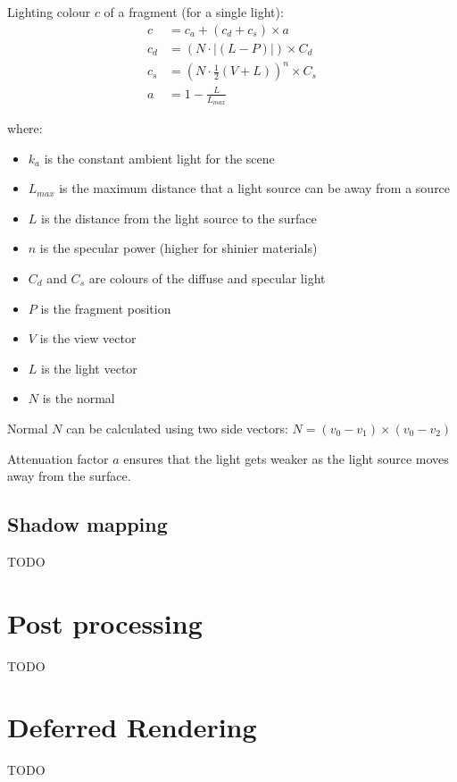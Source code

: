 \documentclass[a4paper]{article}
\begin{document}
Lighting colour $c$ of a fragment (for a single light):
\begin{align*}
  c &= c_{a} + (c_{d} + c_{s}) \times a \\
  c_{d} &= (N \cdot |(L - P)|) \times C_{d} \\
  c_{s} &= (N \cdot \frac{1}{2}(V + L))^{n} \times C_{s}\\
  a &= 1 - \frac{L}{L_{max}}
\end{align*}

where:

\begin{itemize}
  \item $k_{a}$ is the constant ambient light for the scene
  \item $L_{max}$ is the maximum distance that a light source can be away from a
    source
  \item $L$ is the distance from the light source to the surface
  \item $n$ is the specular power (higher for shinier materials)
  \item $C_{d}$ and $C_{s}$ are colours of the diffuse and specular light
  \item $P$ is the fragment position
  \item $V$ is the view vector
  \item $L$ is the light vector
  \item $N$ is the normal
\end{itemize}

Normal $N$ can be calculated using two side vectors: $N = (v_{0} - v_{1}) \times
(v_{0} - v_{2})$

Attenuation factor $a$ ensures that the light gets weaker as the light source
moves away from the surface.

\subsection{Shadow mapping}

TODO

\section{Post processing}

TODO

\section{Deferred Rendering}

TODO
\end{document}
